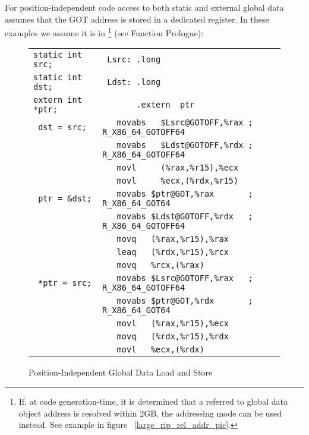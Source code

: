 For position-independent code access to both static and external global
data assumes that the GOT address is stored in a dedicated register.
In these examples we assume it is in \footnote{If,
at code generation-time, it is determined that a referred to global data
object address is resolved within 2GB, the 
addressing mode can be used instead. See example in figure~
\ref{large_rip_rel_addr_pic}.} (see Function Prologue):

\begin{figure}[H]
\Hrule
\caption{Position-Independent Global Data Load and Store}
\label{large_pic_data_load_store}
\begin{center}
\begin{footnotesize}
\begin{tabular}{|l|l|}
\hline
\verb#static int src;  # & \verb# Lsrc: .long                      # \\
\verb#static int dst;  # & \verb# Ldst: .long                      # \\
\verb#extern int *ptr; # & \verb#       .extern  ptr               # \\
\hline 
\verb# dst = src;      # & \verb#   movabs   $Lsrc@GOTOFF,%rax ; R_X86_64_GOTOFF64 # \\
\verb#                 # & \verb#   movabs   $Ldst@GOTOFF,%rdx ; R_X86_64_GOTOFF64 # \\
\verb#                 # & \verb#   movl     (%rax,%r15),%ecx  # \\
\verb#                 # & \verb#   movl     %ecx,(%rdx,%r15)  # \\
\hline
\verb# ptr = &dst;     # & \verb#   movabs $ptr@GOT,%rax       ; R_X86_64_GOT64 # \\
\verb#                 # & \verb#   movabs $Ldst@GOTOFF,%rdx   ; R_X86_64_GOTOFF64 # \\
\verb#                 # & \verb#   movq   (%rax,%r15),%rax    # \\
\verb#                 # & \verb#   leaq   (%rdx,%r15),%rcx    # \\
\verb#                 # & \verb#   movq   %rcx,(%rax)         # \\
\hline
\verb# *ptr = src;     # & \verb#   movabs $Lsrc@GOTOFF,%rax   ; R_X86_64_GOTOFF64 # \\
\verb#                 # & \verb#   movabs $ptr@GOT,%rdx       ; R_X86_64_GOT64 # \\
\verb#                 # & \verb#   movl   (%rax,%r15),%ecx    # \\
\verb#                 # & \verb#   movq   (%rdx,%r15),%rdx    # \\
\verb#                 # & \verb#   movl   %ecx,(%rdx)         # \\
\hline
\end{tabular}
\end{footnotesize}
\end{center}
\end{figure}

